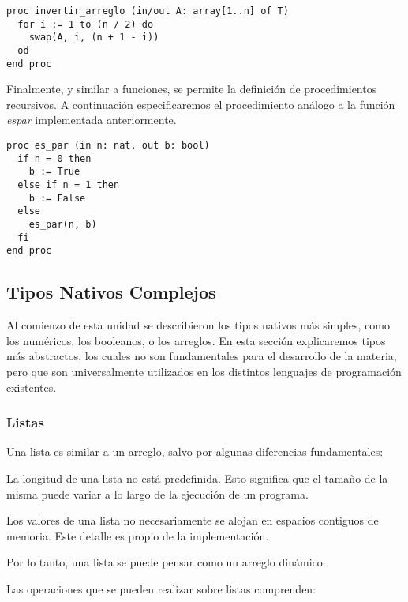 \documentclass{article}
\begin{document}
\begin{lstlisting}
proc invertir_arreglo (in/out A: array[1..n] of T)
  for i := 1 to (n / 2) do
    swap(A, i, (n + 1 - i))
  od
end proc
\end{lstlisting}

Finalmente, y similar a funciones, se permite la definición de procedimientos recursivos.
A continuación especificaremos el procedimiento análogo a la función \textit{es\gbajo par} implementada anteriormente.

\begin{lstlisting}
proc es_par (in n: nat, out b: bool)
  if n = 0 then
    b := True
  else if n = 1 then
    b := False
  else
    es_par(n, b)
  fi
end proc
\end{lstlisting}

\subsection{Tipos Nativos Complejos}

Al comienzo de esta unidad se describieron los tipos nativos más simples, como los numéricos, los booleanos, o los arreglos.
En esta sección explicaremos tipos más abstractos, los cuales no son fundamentales para el desarrollo de la materia, pero que son universalmente utilizados en los distintos lenguajes de programación existentes.

\subsubsection{Listas}

Una lista es similar a un arreglo, salvo por algunas diferencias fundamentales:
\begin{enumerate*}
\item La longitud de una lista no está predefinida.
Esto significa que el tamaño de la misma puede variar a lo largo de la ejecución de un programa.
\item Los valores de una lista no necesariamente se alojan en espacios contiguos de memoria.
Este detalle es propio de la implementación.
\end{enumerate*}
Por lo tanto, una lista se puede pensar como un arreglo dinámico.

Las operaciones que se pueden realizar sobre listas comprenden:
\end{document}
